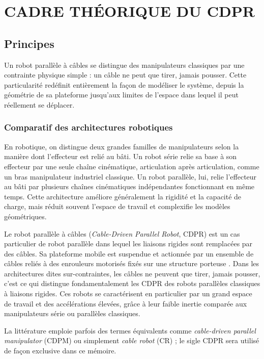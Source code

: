 \chapter{CADRE THÉORIQUE DU CDPR}

\section{Principes}

Un robot parallèle à câbles se distingue des manipulateurs classiques par une contrainte physique simple : un câble ne peut que tirer, jamais pousser. Cette particularité redéfinit entièrement la façon de modéliser le système, depuis la géométrie de sa plateforme jusqu'aux limites de l'espace dans lequel il peut réellement se déplacer.

\subsection{Comparatif des architectures robotiques}

En robotique, on distingue deux grandes familles de manipulateurs selon la manière dont l'effecteur est relié au bâti. Un robot série relie sa base à son effecteur par une seule chaîne cinématique, articulation après articulation, comme un bras manipulateur industriel classique. Un robot parallèle, lui, relie l'effecteur au bâti par plusieurs chaînes cinématiques indépendantes fonctionnant en même temps. Cette architecture améliore généralement la rigidité et la capacité de charge, mais réduit souvent l'espace de travail et complexifie les modèles géométriques.

Le robot parallèle à câbles (\textit{Cable-Driven Parallel Robot}, CDPR) est un cas particulier de robot parallèle dans lequel les liaisons rigides sont remplacées par des câbles. Sa plateforme mobile est suspendue et actionnée par un ensemble de câbles reliés à des enrouleurs motorisés fixés sur une structure porteuse \cite{dahiya2022}. Dans les architectures dites sur-contraintes, les câbles ne peuvent que tirer, jamais pousser, c'est ce qui distingue fondamentalement les CDPR des robots parallèles classiques à liaisons rigides. Ces robots se caractérisent en particulier par un grand espace de travail et des accélérations élevées, grâce à leur faible inertie comparée aux manipulateurs série ou parallèles classiques.

La littérature emploie parfois des termes équivalents comme \textit{cable-driven parallel manipulator} (CDPM) ou simplement \textit{cable robot} (CR) ; le sigle CDPR sera utilisé de façon exclusive dans ce mémoire.

